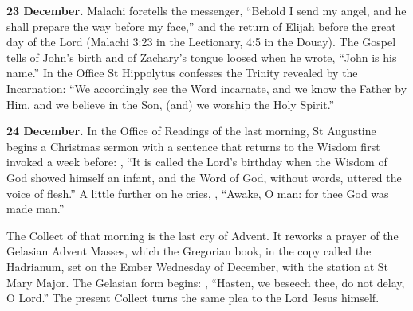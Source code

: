 \textbf{23 December.} Malachi foretells the messenger, ``Behold I send my angel,
and he shall prepare the way before my face,'' and the return of Elijah before
the great day of the Lord (Malachi 3:23 in the Lectionary, 4:5 in the Douay).
The Gospel tells of John's birth and of Zachary's tongue loosed when he wrote,
``John is his name.'' In the Office St Hippolytus confesses the Trinity revealed
by the Incarnation: ``We accordingly see the Word incarnate, and we know the
Father by Him, and we believe in the Son, (and) we worship the Holy Spirit.''

\textbf{24 December.} In the Office of Readings of the last morning, St
Augustine begins a Christmas sermon with a sentence that returns to the Wisdom
first invoked a week before:
, ``It is called the Lord's birthday
when the Wisdom of God showed himself an infant, and the Word of God, without
words, uttered the voice of flesh.'' A little further on he cries,
, ``Awake, O man: for thee
God was made man.''

The Collect of that morning is the last cry of Advent. It reworks a prayer of
the Gelasian Advent Masses, which the Gregorian book, in the copy called the
Hadrianum, set on the Ember Wednesday of December, with the station at St Mary
Major. The Gelasian form begins:
, ``Hasten, we beseech thee, do
not delay, O Lord.'' The present Collect turns the same plea to the Lord Jesus
himself.

